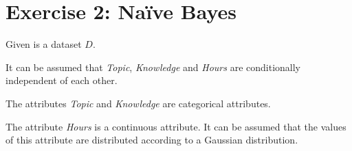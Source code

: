 \documentclass[
english,
smallborders
]{i6prcsht}
\begin{document}
\newpage

\section*{Exercise 2: Naïve Bayes}

\begin{minipage}{.375\textwidth}
	Given is a dataset $D$.
	
	\vspace*{0.5cm}
	
	It can be assumed that \textit{Topic}, \textit{Knowledge} and \textit{Hours} are conditionally independent of each other.
	
	\vspace*{0.5cm}
	
	The attributes \textit{Topic} and \textit{Knowledge} are categorical attributes.
	
	\vspace*{0.1cm}
	
	The attribute \textit{Hours} is a continuous attribute. It can be assumed that the values of this attribute are distributed according to a Gaussian distribution.
\end{minipage}
\begin{minipage}{.625\textwidth}
	\begin{flushright}
	\end{flushright}
\end{minipage}
\end{document}

